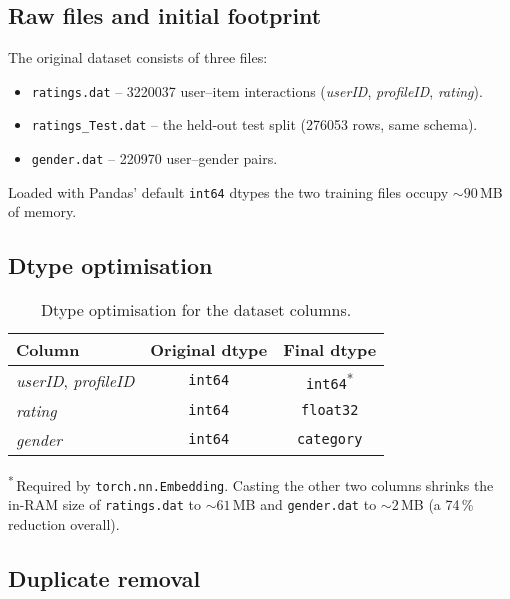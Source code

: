 \subsection*{Raw files and initial footprint}

The original dataset consists of three files:

\begin{itemize}
  \item \texttt{ratings.dat} – \num{3220037} user--item interactions
        (\textit{userID}, \textit{profileID}, \textit{rating})\@.
  \item \texttt{ratings\_Test.dat} – the held-out test split
        (\num{276053} rows, same schema).
  \item \texttt{gender.dat} – \num{220970} user--gender pairs.
\end{itemize}

Loaded with Pandas’ default \texttt{int64} dtypes the two training files occupy
$\sim\!90$\,MB of memory.

\subsection*{Dtype optimisation}

\vspace{2pt}

\begin{table}[H]
  \centering
  \begin{tabular}{@{}lcc@{}}
        \toprule
        \textbf{Column} & \textbf{Original dtype} & \textbf{Final dtype} \\ \midrule
        \textit{userID}, \textit{profileID} & \texttt{int64} & \texttt{int64}\textsuperscript{*} \\
        \textit{rating}                     & \texttt{int64} & \texttt{float32} \\
        \textit{gender}                     & \texttt{int64} & \texttt{category} \\ \bottomrule
  \end{tabular}
  \caption{Dtype optimisation for the dataset columns.}
  \label{tab:dtype-optimisation}
\end{table}

\smallskip
\noindent\textsuperscript{*}\,Required by \texttt{torch.nn.Embedding}.
Casting the other two columns shrinks the in-RAM size of
\texttt{ratings.dat} to $\sim\!61$\,MB and \texttt{gender.dat} to
$\sim\!2$\,MB (a 74\,\% reduction overall).

\subsection*{Duplicate removal}


